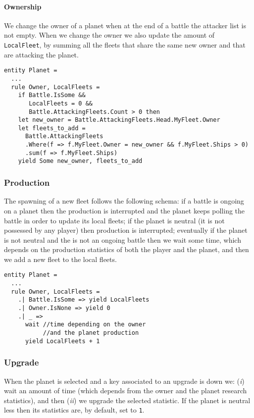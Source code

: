 \paragraph{Ownership}
We change the owner of a planet when at the end of a battle the attacker list is not empty. When we change the owner we also update the amount of \texttt{LocalFleet}, by summing all the fleets that share the same new owner and that are attacking the planet.
\begin{lstlisting}
entity Planet =
  ...
  rule Owner, LocalFleets =
    if Battle.IsSome &&
       LocalFleets = 0 &&
       Battle.AttackingFleets.Count > 0 then
    let new_owner = Battle.AttackingFleets.Head.MyFleet.Owner
    let fleets_to_add =
	  Battle.AttackingFleets
	  .Where(f => f.MyFleet.Owner = new_owner && f.MyFleet.Ships > 0)
	  .sum(f => f.MyFleet.Ships)
    yield Some new_owner, fleets_to_add 
\end{lstlisting}


\subsubsection{Production}
The spawning of a new fleet follows the following schema: if a battle is ongoing on a planet then the production is interrupted and the planet keeps polling the battle in order to update its local fleets; if the planet is neutral (it is not possessed by any player) then production is interrupted; eventually if the planet is not neutral and the is not an ongoing battle then we wait some time, which depends on the production statistics of both the player and the planet, and then we add a new fleet to the local fleets.
\begin{lstlisting}
entity Planet =
  ...
  rule Owner, LocalFleets =
    .| Battle.IsSome => yield LocalFleets
    .| Owner.IsNone => yield 0
    .| _ =>
      wait //time depending on the owner
           //and the planet production
      yield LocalFleets + 1
\end{lstlisting}


\subsubsection{Upgrade} When the planet is selected and a key associated to an upgrade is down we: (\textit{i}) wait an amount of time (which depends from the owner and the planet research statistics), and then (\textit{ii}) we upgrade the selected statistic. If the planet is neutral less then its statistics are, by default, set to \texttt{1}.

